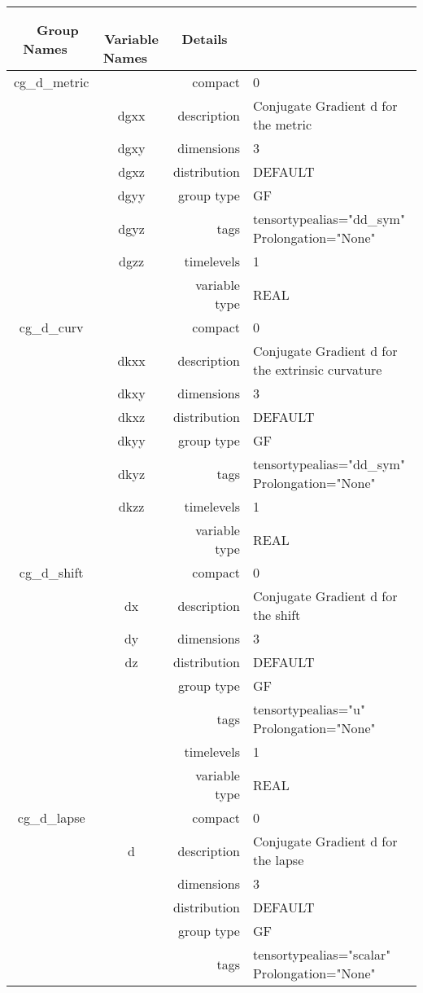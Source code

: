 \begin{tabular*}{150mm}{|c|c@{\extracolsep{\fill}}|rl|} \hline 
~ {\bf Group Names} ~ & ~ {\bf Variable Names} ~  &{\bf Details} ~ & ~ \\ 
\hline 
cg\_d\_metric &  & compact & 0 \\ 
 & dgxx & description & Conjugate Gradient d for the metric \\ 
 & dgxy & dimensions & 3 \\ 
 & dgxz & distribution & DEFAULT \\ 
 & dgyy & group type & GF \\ 
 & dgyz & tags & tensortypealias="dd\_sym" Prolongation="None" \\ 
 & dgzz & timelevels & 1 \\ 
 &  & variable type & REAL \\ 
\hline 
cg\_d\_curv &  & compact & 0 \\ 
 & dkxx & description & Conjugate Gradient d for the extrinsic curvature \\ 
 & dkxy & dimensions & 3 \\ 
 & dkxz & distribution & DEFAULT \\ 
 & dkyy & group type & GF \\ 
 & dkyz & tags & tensortypealias="dd\_sym" Prolongation="None" \\ 
 & dkzz & timelevels & 1 \\ 
 &  & variable type & REAL \\ 
\hline 
cg\_d\_shift &  & compact & 0 \\ 
 & dx & description & Conjugate Gradient d for the shift \\ 
 & dy & dimensions & 3 \\ 
 & dz & distribution & DEFAULT \\ 
 &  & group type & GF \\ 
 &  & tags & tensortypealias="u" Prolongation="None" \\ 
 &  & timelevels & 1 \\ 
 &  & variable type & REAL \\ 
\hline 
cg\_d\_lapse &  & compact & 0 \\ 
 & d & description & Conjugate Gradient d for the lapse \\ 
 &  & dimensions & 3 \\ 
 &  & distribution & DEFAULT \\ 
 &  & group type & GF \\ 
 &  & tags & tensortypealias="scalar" Prolongation="None" \\ 

\end{tabular*}
